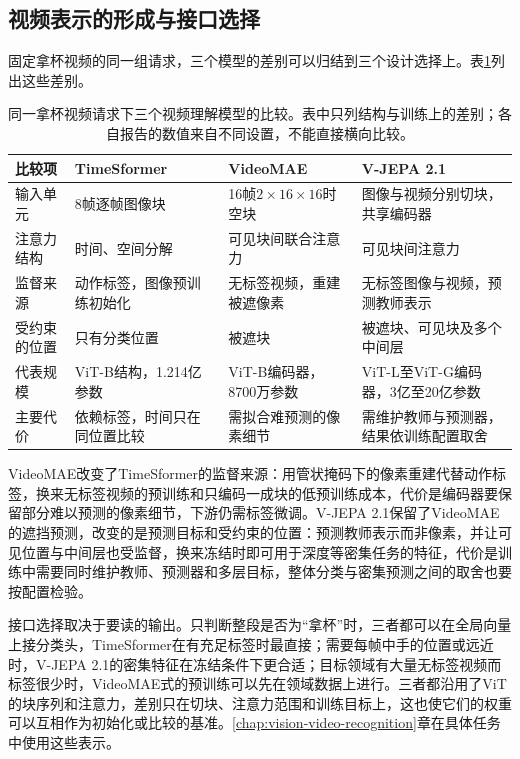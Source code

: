 \subsection{视频表示的形成与接口选择}
\label{sec:vision-ivm-video-interface}

固定拿杯视频的同一组请求，三个模型的差别可以归结到三个设计选择上。表\ref{tab:vision-ivm-video-models}列出这些差别。

\begin{table}[htbp]
  \centering
  \small
  \begin{tabularx}{\linewidth}{@{}p{16mm}XXX@{}}
    \toprule
    比较项 & TimeSformer & VideoMAE & V-JEPA 2.1\\
    \midrule
    输入单元 & 8帧逐帧图像块 & 16帧$2\times16\times16$时空块 & 图像与视频分别切块，共享编码器\\
    注意力结构 & 时间、空间分解 & 可见块间联合注意力 & 可见块间注意力\\
    监督来源 & 动作标签，图像预训练初始化 & 无标签视频，重建被遮像素 & 无标签图像与视频，预测教师表示\\
    受约束的位置 & 只有分类位置 & 被遮块 & 被遮块、可见块及多个中间层\\
    代表规模 & ViT-B结构，1.214亿参数 & ViT-B编码器，8700万参数 & ViT-L至ViT-G编码器，3亿至20亿参数\\
    主要代价 & 依赖标签，时间只在同位置比较 & 需拟合难预测的像素细节 & 需维护教师与预测器，结果依训练配置取舍\\
    \bottomrule
  \end{tabularx}
  \caption{同一拿杯视频请求下三个视频理解模型的比较。表中只列结构与训练上的差别；各自报告的数值来自不同设置，不能直接横向比较。}
  \label{tab:vision-ivm-video-models}
\end{table}
\FloatBarrier

VideoMAE改变了TimeSformer的监督来源：用管状掩码下的像素重建代替动作标签，换来无标签视频的预训练和只编码一成块的低预训练成本，代价是编码器要保留部分难以预测的像素细节，下游仍需标签微调。V-JEPA 2.1保留了VideoMAE的遮挡预测，改变的是预测目标和受约束的位置：预测教师表示而非像素，并让可见位置与中间层也受监督，换来冻结时即可用于深度等密集任务的特征，代价是训练中需要同时维护教师、预测器和多层目标，整体分类与密集预测之间的取舍也要按配置检验。

接口选择取决于要读的输出。只判断整段是否为“拿杯”时，三者都可以在全局向量上接分类头，TimeSformer在有充足标签时最直接；需要每帧中手的位置或远近时，V-JEPA 2.1的密集特征在冻结条件下更合适；目标领域有大量无标签视频而标签很少时，VideoMAE式的预训练可以先在领域数据上进行。三者都沿用了ViT的块序列和注意力，差别只在切块、注意力范围和训练目标上，这也使它们的权重可以互相作为初始化或比较的基准。\ref{chap:vision-video-recognition}章在具体任务中使用这些表示。

